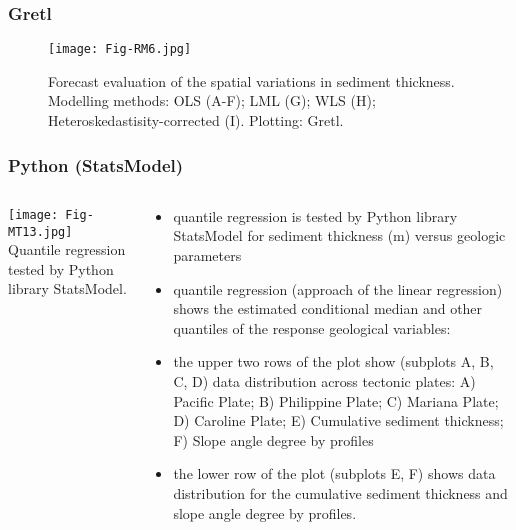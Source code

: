 \documentclass[pdflatex,compress,8pt,
	xcolor={dvipsnames,dvipsnames,svgnames,x11names,table},
	hyperref={colorlinks = true,breaklinks = true, urlcolor = NavyBlue, breaklinks = true}]{beamer}
\begin{document}
\begin{frame}\frametitle{Gretl}
\begin{figure}[H]
	\centering
		\texttt{[image: Fig-RM6.jpg]}
	\caption{Forecast evaluation of the spatial variations in sediment thickness. Modelling methods: OLS (A-F); LML (G); WLS (H); Heteroskedastisity-corrected (I). Plotting: Gretl. \cite{Lemenkova201988}}\label{fig:RM6}
\end{figure}
\end{frame}

\begin{frame}\frametitle{Python (StatsModel)}

\begin{minipage}[0.4\textheight]{\textwidth}
\begin{columns}[T]
\begin{column}{0.5\textwidth}
\vspace{2em}
	\texttt{[image: Fig-MT13.jpg]}
Quantile regression tested by Python library StatsModel. \cite{Lemenkova201989}
\end{column}
\begin{column}{0.5\textwidth}
\vspace{2em}
\begin{itemize}
            \item quantile regression is tested by Python library StatsModel \cite{Rossumatal2018} for sediment thickness (m) versus geologic parameters \cite{Lemenkova201989}
            \item quantile regression (approach of the linear regression) shows the estimated conditional median and other quantiles of the response geological variables: 
            \item the upper two rows of the plot show (subplots A, B, C, D) data distribution across tectonic plates: A) Pacific Plate; B) Philippine Plate; C) Mariana Plate; D) Caroline Plate; E) Cumulative sediment thickness; F) Slope angle degree by profiles
            \item the lower row of the plot (subplots E, F) shows data distribution for the cumulative sediment thickness and slope angle degree by profiles.
\end{itemize}	
\end{column}
\end{columns}
\end{minipage}

\end{frame}
\end{document}
